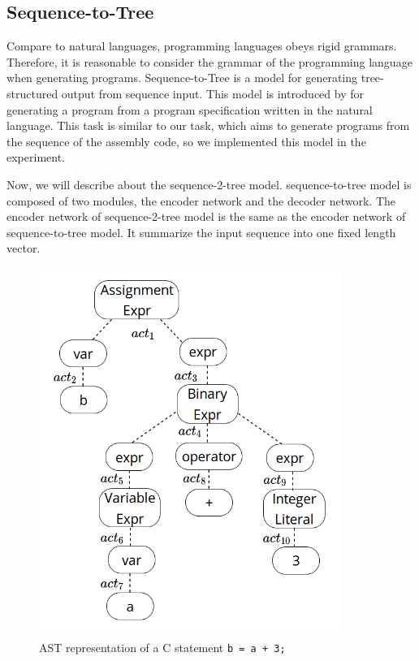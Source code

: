 \documentclass[senior,final,11pt]{iscs-thesis}
\begin{document}






\subsection{Sequence-to-Tree}
Compare to natural languages, programming languages obeys rigid grammars. %
Therefore, it is reasonable to consider the grammar of the programming language when generating programs.
Sequence-to-Tree is a model for generating tree-structured output from sequence input. 
This model is introduced by \citet{Seq2Tree} for generating a program from a program specification written in the natural language. 
This task is similar to our task, which aims to generate programs from the sequence of the assembly code, so we implemented this model in the experiment.

Now, we will describe about the sequence-2-tree model.
sequence-to-tree model is composed of two modules, the encoder network and the decoder network.
The encoder network of sequence-2-tree model is the same as the encoder network of sequence-to-tree model. It summarize the input sequence into one fixed length vector.

\begin{figure}[]
	\begin{center}
	\includegraphics[height=12cm]{ast_zu.png}
	\end{center}
	\caption{AST representation of a C statement \texttt{b = a + 3;} }
	\label{fig:ast_zu}
\end{figure}
\end{document}
